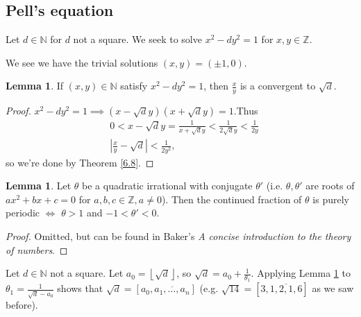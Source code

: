 \documentclass{article}
\theoremstyle{definition}
\newtheorem{lemma}[theorem]{Lemma}
\begin{document}
\subsection*{Pell's equation}
Let $d \in \mathbb{N}$ for $d$ not a square. We seek to solve $x^2-dy^2 = 1$ for $x,y \in \mathbb{Z}$. 

We see we have the trivial solutions $(x,y)=(\pm 1,0)$.

\begin{lemma}
    If $(x,y) \in \mathbb{N}$ satisfy $x^2-dy^2=1$, then $\frac{x}{y}$ is a convergent to $\sqrt{d}.$ 
\end{lemma}
\begin{proof}
    $x^2-dy^2=1 \implies (x-\sqrt{d}y)(x+\sqrt{d}y)=1$.Thus 
    \begin{align*}
        &0<x - \sqrt{d}y = \frac{1}{x+ \sqrt{d}y} < \frac{1}{2\sqrt{d}y} < \frac{1}{2y} \\
        &\left|\frac{x}{y}-\sqrt{d}\right|<\frac{1}{2y^2},
    \end{align*}
    so we're done by Theorem \ref{6.8}.
\end{proof}
\begin{lemma}\label{6.11}
    Let $\theta$ be a quadratic irrational with conjugate $\theta'$ (i.e. $\theta,\theta'$ are roots of $ax^2+bx+c=0$ for $a,b,c \in \mathbb{Z}, a \neq 0$). Then the continued fraction of $\theta$ is purely periodic $\iff$ $\theta>1$ and $-1<\theta'<0$.
\end{lemma}
\begin{proof}
    Omitted, but can be found in Baker's \textit{A concise introduction to the theory of numbers}. 
\end{proof}

Let $d \in \mathbb{N}$ not a square. Let $a_0 = \left\lfloor \sqrt{d} \right\rfloor$, so $\sqrt{d}=a_0 + \frac{1}{\theta_1}$. Applying Lemma \ref{6.11} to $\theta_1 = \frac{1}{\sqrt{d}-a_0}$ shows that $\sqrt{d}=[a_0,\overline{a_1,\ldots,a_n}]$ (e.g. $\sqrt{14} = [3,\overline{1,2,1,6}]$ as we saw before).
\end{document}
